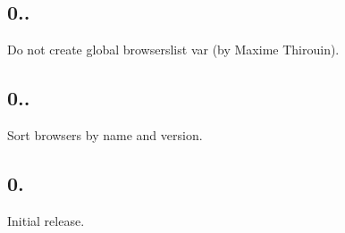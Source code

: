 \subsection*{0..}


\begin{DoxyItemize}
\item Do not create global {\ttfamily browserslist} var (by Maxime Thirouin).
\end{DoxyItemize}

\subsection*{0..}


\begin{DoxyItemize}
\item Sort browsers by name and version.
\end{DoxyItemize}

\subsection*{0.}


\begin{DoxyItemize}
\item Initial release. 
\end{DoxyItemize}